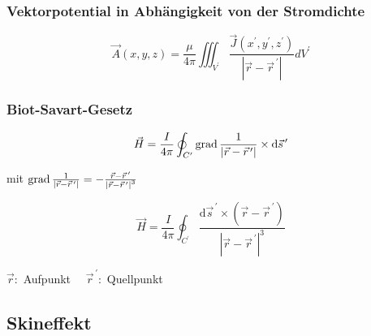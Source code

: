 \subsubsection{Vektorpotential in Abhängigkeit von der Stromdichte}
\[
    \vec{A}(x, y, z)=\frac{\mu}{4 \pi} \iiint_{V^{\prime}} \frac{\vec{J}\left(x^{\prime}, y^{\prime}, z^{\prime}\right)}{\left|\vec{r}-\vec{r}^{\,\prime}\right|} d V^{\prime}
\]

\subsubsection{Biot-Savart-Gesetz}
\[
    \vec{H}=\frac{I}{4 \pi} \oint_{C^{\prime}} \operatorname{grad} \frac{1}{\left|\vec{r}-\vec{r}^{\,\prime}\right|} \times \mathrm{d} \vec{s}^{\,\prime}
\]

mit $\operatorname{grad} \frac{1}{\left|\vec{r}-\vec{r}^{\,\prime}\right|}=-\frac{\vec{r}-\vec{r}^{\,\prime}}{\left|\vec{r}-\vec{r}^{\,\prime}\right|^{3}}$

\[
    \vec{H}=\frac{I}{4 \pi} \oint_{C^{\prime}} \frac{\mathrm{d} \vec{s}^{\,\prime} \times\left(\vec{r}-\vec{r}^{\,\prime}\right)}{\left|\vec{r}-\vec{r}^{\,\prime}\right|^{3}}
\]

{\footnotesize$\vec{r}:$ Aufpunkt $\quad \vec{r}^{\,\prime}:$ Quellpunkt}

\subsection{Skineffekt}





